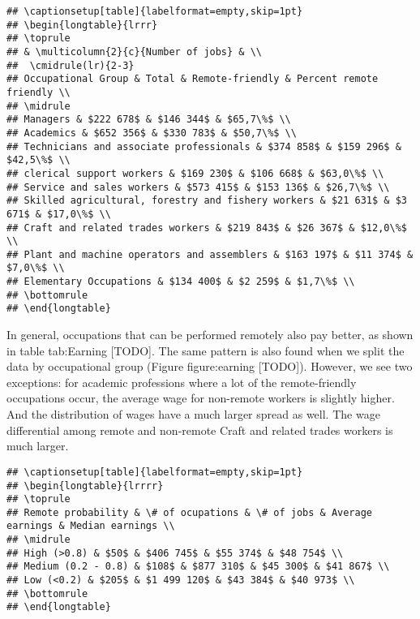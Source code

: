 \documentclass[11pt,]{article}
\begin{document}
\begin{verbatim}
## \captionsetup[table]{labelformat=empty,skip=1pt}
## \begin{longtable}{lrrr}
## \toprule
## & \multicolumn{2}{c}{Number of jobs} & \\ 
##  \cmidrule(lr){2-3}
## Occupational Group & Total & Remote-friendly & Percent remote friendly \\ 
## \midrule
## Managers & $222 678$ & $146 344$ & $65,7\%$ \\ 
## Academics & $652 356$ & $330 783$ & $50,7\%$ \\ 
## Technicians and associate professionals & $374 858$ & $159 296$ & $42,5\%$ \\ 
## clerical support workers & $169 230$ & $106 668$ & $63,0\%$ \\ 
## Service and sales workers & $573 415$ & $153 136$ & $26,7\%$ \\ 
## Skilled agricultural, forestry and fishery workers & $21 631$ & $3 671$ & $17,0\%$ \\ 
## Craft and related trades workers & $219 843$ & $26 367$ & $12,0\%$ \\ 
## Plant and machine operators and assemblers & $163 197$ & $11 374$ & $7,0\%$ \\ 
## Elementary Occupations & $134 400$ & $2 259$ & $1,7\%$ \\ 
## \bottomrule
## \end{longtable}
\end{verbatim}

In general, occupations that can be performed remotely also pay better,
as shown in table tab:Earning {[}TODO{]}. The same pattern is also found
when we split the data by occupational group (Figure figure:earning
{[}TODO{]}). However, we see two exceptions: for academic professions
where a lot of the remote-friendly occupations occur, the average wage
for non-remote workers is slightly higher. And the distribution of wages
have a much larger spread as well. The wage differential among remote
and non-remote Craft and related trades workers is much larger.

\begin{verbatim}
## \captionsetup[table]{labelformat=empty,skip=1pt}
## \begin{longtable}{lrrrr}
## \toprule
## Remote probability & \# of ocupations & \# of jobs & Average earnings & Median earnings \\ 
## \midrule
## High (>0.8) & $50$ & $406 745$ & $55 374$ & $48 754$ \\ 
## Medium (0.2 - 0.8) & $108$ & $877 310$ & $45 300$ & $41 867$ \\ 
## Low (<0.2) & $205$ & $1 499 120$ & $43 384$ & $40 973$ \\ 
## \bottomrule
## \end{longtable}
\end{verbatim}
\end{document}
